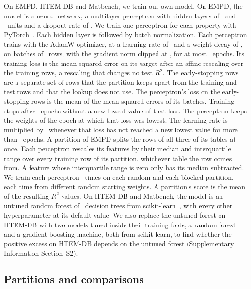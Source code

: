\documentclass[11pt]{article}
\begin{document}
On EMPD, HTEM-DB and Matbench, we train our own model. On EMPD, the model is a neural network, a
multilayer perceptron with hidden layers of \mlpFirstLayer\ and \mlpSecondLayer\ units and a dropout
rate of \mlpDropout. We train one perceptron for each property with
PyTorch~\torchVersion.\cite{paszke2019pytorch} Each hidden layer is followed by
batch normalization. Each perceptron trains with the AdamW optimizer, at a
learning rate of \mlpLearningRate\ and a weight decay of \mlpWeightDecay, on
batches of \mlpBatchSize\ rows, with the gradient norm clipped at
\mlpMaxGradNorm, for at most \mlpEpochs\ epochs. Its training loss is the mean squared error on its target after an affine
rescaling over the training rows, a rescaling that changes no test $R^2$. The early-stopping rows are a separate set
of rows that the partition keeps apart from the training and test rows and that
the lookup does not use. The perceptron's loss on the early-stopping rows is the mean of the mean
squared errors of its batches. Training stops after \mlpPatience\ epochs
without a new lowest value of that loss. The perceptron keeps the weights of
the epoch at which that loss was lowest. The
learning rate is multiplied by \mlpLrFactor\ whenever that loss has not reached
a new lowest value for more than \mlpLrPatience\ epochs. A partition of EMPD splits
the rows of all three of its tables at once. Each perceptron rescales its
features by their median and interquartile range over every training row of its partition, whichever table the row comes from. A feature whose interquartile
range is zero only has its median subtracted.
We train each perceptron \splitInits\ times on each random and each blocked partition, each time from
different random starting weights. A partition's score is the mean of the
resulting $R^2$ values. On
HTEM-DB and Matbench, the model is an untuned random
forest\cite{breiman2001randomforests} of \htemTrees\ decision trees from
scikit-learn~\sklearnVersion,\cite{pedregosa2011sklearn} with every other
hyperparameter at its default value. We also replace the untuned forest on HTEM-DB with two
models tuned inside their training folds, a random forest and a gradient-boosting
machine,\cite{friedman2001gradient} both from scikit-learn, to find whether the
positive excess on HTEM-DB depends on the untuned forest (Supplementary
Information Section~S2).

\subsection*{Partitions and comparisons}
\label{sec:protocol}
\end{document}
